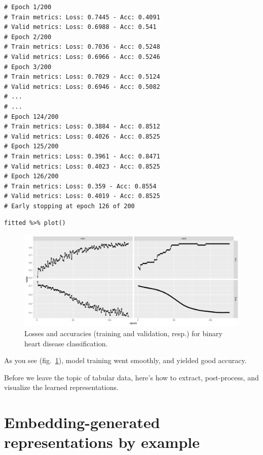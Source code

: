 \documentclass[
  letterpaper,
]{krantz}
\begin{document}
\begin{verbatim}
# Epoch 1/200
# Train metrics: Loss: 0.7445 - Acc: 0.4091
# Valid metrics: Loss: 0.6988 - Acc: 0.541
# Epoch 2/200
# Train metrics: Loss: 0.7036 - Acc: 0.5248
# Valid metrics: Loss: 0.6966 - Acc: 0.5246
# Epoch 3/200
# Train metrics: Loss: 0.7029 - Acc: 0.5124
# Valid metrics: Loss: 0.6946 - Acc: 0.5082
# ...
# ...
# Epoch 124/200
# Train metrics: Loss: 0.3884 - Acc: 0.8512
# Valid metrics: Loss: 0.4026 - Acc: 0.8525
# Epoch 125/200
# Train metrics: Loss: 0.3961 - Acc: 0.8471
# Valid metrics: Loss: 0.4023 - Acc: 0.8525
# Epoch 126/200
# Train metrics: Loss: 0.359 - Acc: 0.8554
# Valid metrics: Loss: 0.4019 - Acc: 0.8525
# Early stopping at epoch 126 of 200
\end{verbatim}

\begin{verbatim}
fitted %>% plot()
\end{verbatim}

\begin{figure}[H]

{\centering \includegraphics{images/tabular-heart-disease-fit.png}

}

\caption{\label{fig-tabular-heart-disease-fit}Losses and accuracies
(training and validation, resp.) for binary heart disease
classification.}

\end{figure}

As you see (fig.~\ref{fig-tabular-heart-disease-fit}), model training
went smoothly, and yielded good accuracy.

Before we leave the topic of tabular data, here's how to extract,
post-process, and visualize the learned representations.

\hypertarget{embedding-generated-representations-by-example}{%
\section{Embedding-generated representations by
example}\label{embedding-generated-representations-by-example}}
\end{document}
